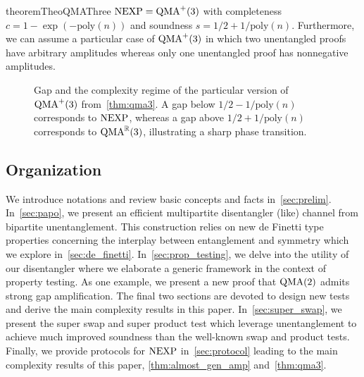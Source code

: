 \documentclass[10pt,a4paper]{article}
\theoremstyle{remark}
\newcommand{\R}{{\mathbb R}}
\newcommand{\poly}{{\mathrm{poly}}}
\newcommand{\1}[1]{\mathds{1}{[#1]}}
\newcommand{\QMA}{\textup{QMA}}
\newcommand{\NEXP}{\textup{NEXP}}
\numberwithin{equation}{section}
\begin{document}
\begin{restatable}{theorem}{TheoQMAThree}\label{thm:qma3}
  $\NEXP = \textup{QMA}^+(3)$ with completeness $c=1-\exp(-\poly(n))$
  and soundness $s=1/2+1/\poly(n)$. Furthermore, we can assume a
  particular case of $\textup{QMA}^+(3)$ in which two unentangled
  proofs have arbitrary amplitudes whereas only one unentangled proof has
  nonnegative amplitudes.
\end{restatable}

\begin{figure}[ht]
  \captionsetup{width=.8\linewidth}
  \centering
{}
\caption{Gap and the complexity regime of the particular version of $\QMA^+(3)$ from~\cref{thm:qma3}.
         A gap below $1/2-1/\poly(n)$ corresponds to $\NEXP$, whereas a gap above $1/2+1/\poly(n)$
         corresponds to $\QMA^\R(3)$, illustrating a sharp phase transition.}
\end{figure}


\subsection{Organization}

We introduce notations and review basic concepts and facts in~\cref{sec:prelim}.
%
In~\cref{sec:papo}, we present an efficient multipartite disentangler (like) channel from bipartite unentanglement.
%
This construction relies on new de Finetti type properties concerning the interplay between entanglement and symmetry
which we explore in~\cref{sec:de_finetti}.
%
In~\cref{sec:prop_testing}, we delve into the utility of our disentangler where we elaborate a generic framework in the context of property testing. As one example, we present a new proof that $\QMA(2)$ admits strong gap amplification.
%
The final two sections are devoted to design new tests and derive the main complexity results in this paper.
In~\cref{sec:super_swap}, we present the super swap and super product test which leverage
unentanglement to achieve much improved soundness than the well-known swap and product tests.
%
Finally, we provide protocols for $\NEXP$ in~\cref{sec:protocol} leading to the main complexity results of this paper,
\cref{thm:almost_gen_amp} and~\cref{thm:qma3}.
\end{document}
